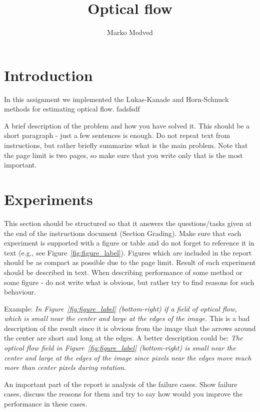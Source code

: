 \documentclass[9pt]{IEEEtran}
\title{\vspace{0ex}
Optical flow}
\author{Marko Medved\vspace{-4.0ex}}
\begin{document}
\maketitle

\section{Introduction}
In this assignment we implemented the Lukas-Kanade and Horn-Schnuck methods for estimating optical flow. 
fadsfsdf 

A brief description of the problem and how you have solved it. This should be a short paragraph - just a few sentences is enough.
Do not repeat text from instructions, but rather briefly summarize what is the main problem.
Note that the page limit is two pages, so make sure that you write only that is the most important.

\section{Experiments}

This section should be structured so that it answers the questions/tasks given at the end of the instructions document (Section Grading). 
Make sure that each experiment is supported with a figure or table and do not forget to reference it in text (e.g., see Figure~\ref{fig:figure_label}). 
Figures which are included in the report should be as compact as possible due to the page limit.
Result of each experiment should be described in text. When describing performance of some method or some figure - do not write what is obvious, but rather try to find reasons for such behaviour.

Example: 
{\it In Figure~\ref{fig:figure_label} (bottom-right) if a field of optical flow, which is small near the center and large at the edges of the image.}
This is a bad description of the result since it is obvious from the image that the arrows around the center are short and long at the edges.
A better description could be:
{\it The optical flow field in Figure~\ref{fig:figure_label} (bottom-right) is small near the center and large at the edges of the image since pixels near the edges move much more than center pixels during rotation.}

An important part of the report is analysis of the failure cases. 
Show failure cases, discuss the reasons for them and try to say how would you improve the performance in these cases.
\end{document}
